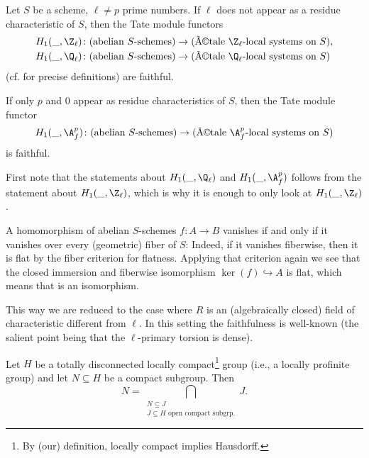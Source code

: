 \documentclass[a4paper]{scrartcl} %
\numberwithin{equation}{section}
\begin{document}
\begin{Lemma}\label{tate-faithful}
  Let $S$ be a scheme, $\ell\ne p$ prime numbers. If $\ell$ does not appear as a residue characteristic of $S$, then the Tate module functors
  \begin{align*}
    H_1(\_,\Z_\ell)&\colon (\text{abelian } S\text{-schemes})\to (\text{Ã©tale }\Z_\ell\text{-local systems on } S), \\
    H_1(\_,\Q_\ell)&\colon (\text{abelian } S\text{-schemes})\to (\text{Ã©tale }\Q_\ell\text{-local systems on } S)
  \end{align*}
  (cf. \cite[\nopp III, 5.4 and 6.2]{groth-bt} for precise definitions) are faithful.

  If only $p$ and $0$ appear as residue characteristics of $S$, then the Tate module functor
  \begin{equation*}
    H_1(\_,\A_f^p)\colon (\text{abelian } S\text{-schemes})\to (\text{Ã©tale }\A_f^p\text{-local systems on } S)
  \end{equation*}
  is faithful.
\end{Lemma}


\begin{Proof}
  First note that the statements about $H_1(\_,\Q_\ell)$ and $H_1(\_,\A_f^p)$ follows from the statement about $H_1(\_,\Z_\ell)$, which is why it is enough to only look at $H_1(\_,\Z_\ell)$.

  A homomorphism of abelian $S$-schemes $f\colon A\to B$ vanishes if and only if it vanishes over every (geometric) fiber of $S$: Indeed, if it vanishes fiberwise, then it is flat by the fiber criterion for flatness. Applying that criterion again we see that the closed immersion and fiberwise isomorphism $\ker(f)\hookrightarrow A$ is flat, which means that is an isomorphism.

  This way we are reduced to the case where $R$ is an (algebraically closed) field of characteristic different from $\ell$. In this setting the faithfulness is well-known (the salient point being that the $\ell$-primary torsion is dense).
\end{Proof}



\begin{Lemma}\label{dantzig}
  Let $H$ be a totally disconnected locally compact\footnote{By (our) definition, locally compact implies Hausdorff.} group (i.e., a locally profinite group) and let $N\subseteq H$ be a compact subgroup. Then
  \begin{equation*}
    N = \bigcap_{\substack{N\subseteq J \\J\subseteq H\text{ open compact subgrp.}}} J.
  \end{equation*}
\end{Lemma}
\end{document}

